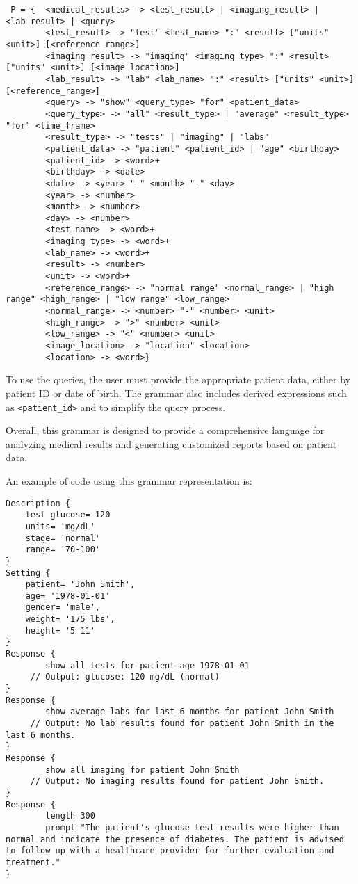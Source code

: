 \begin{lstlisting}
 P = {  <medical_results> -> <test_result> | <imaging_result> | <lab_result> | <query>
        <test_result> -> "test" <test_name> ":" <result> ["units" <unit>] [<reference_range>]
        <imaging_result> -> "imaging" <imaging_type> ":" <result> ["units" <unit>] [<image_location>]
        <lab_result> -> "lab" <lab_name> ":" <result> ["units" <unit>] [<reference_range>]
        <query> -> "show" <query_type> "for" <patient_data>
        <query_type> -> "all" <result_type> | "average" <result_type> "for" <time_frame>
        <result_type> -> "tests" | "imaging" | "labs"
        <patient_data> -> "patient" <patient_id> | "age" <birthday>
        <patient_id> -> <word>+
        <birthday> -> <date>
        <date> -> <year> "-" <month> "-" <day>
        <year> -> <number>
        <month> -> <number>
        <day> -> <number>
        <test_name> -> <word>+
        <imaging_type> -> <word>+
        <lab_name> -> <word>+
        <result> -> <number>
        <unit> -> <word>+
        <reference_range> -> "normal range" <normal_range> | "high range" <high_range> | "low range" <low_range>
        <normal_range> -> <number> "-" <number> <unit>
        <high_range> -> ">" <number> <unit>
        <low_range> -> "<" <number> <unit>
        <image_location> -> "location" <location>
        <location> -> <word>}
\end{lstlisting}

To use the queries, the user must provide the appropriate patient data, either by patient ID or date of birth. The grammar also includes derived expressions such as \texttt{<patient\_id>} and to simplify the query process.

Overall, this grammar is designed to provide a comprehensive language for analyzing medical results and generating customized reports based on patient data.

An example of code using this grammar representation is:

\begin{lstlisting}
Description { 
	test glucose= 120 
	units= 'mg/dL' 
	stage= 'normal' 
	range= '70-100'
}
Setting {
	patient= 'John Smith', 
	age= '1978-01-01'
	gender= 'male',
	weight= '175 lbs',
	height= '5 11'
}
Response {
    	show all tests for patient age 1978-01-01
   	 // Output: glucose: 120 mg/dL (normal)
}
Response {
    	show average labs for last 6 months for patient John Smith
   	 // Output: No lab results found for patient John Smith in the last 6 months.
}
Response {
    	show all imaging for patient John Smith
   	 // Output: No imaging results found for patient John Smith.
}
Response {
    	length 300 
    	prompt "The patient's glucose test results were higher than normal and indicate the presence of diabetes. The patient is advised to follow up with a healthcare provider for further evaluation and treatment."
}    
\end{lstlisting}

